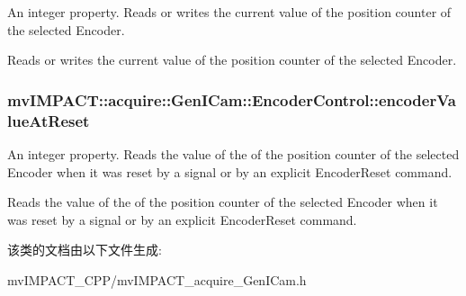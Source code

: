 An integer property. Reads or writes the current value of the position counter of the selected Encoder. 

Reads or writes the current value of the position counter of the selected Encoder. \hypertarget{classmv_i_m_p_a_c_t_1_1acquire_1_1_gen_i_cam_1_1_encoder_control_abe3354fcac087829fe183d54f9a8da19}{
\subsubsection[{encoder\+Value\+At\+Reset}]{ mv\+I\+M\+P\+A\+C\+T\+::acquire\+::\+Gen\+I\+Cam\+::\+Encoder\+Control\+::encoder\+Value\+At\+Reset}}\label{classmv_i_m_p_a_c_t_1_1acquire_1_1_gen_i_cam_1_1_encoder_control_abe3354fcac087829fe183d54f9a8da19}


An integer property. Reads the value of the of the position counter of the selected Encoder when it was reset by a signal or by an explicit Encoder\+Reset command. 

Reads the value of the of the position counter of the selected Encoder when it was reset by a signal or by an explicit Encoder\+Reset command. 

该类的文档由以下文件生成\+:\begin{DoxyCompactItemize}
\item 
mv\+I\+M\+P\+A\+C\+T\+\_\+\+C\+P\+P/mv\+I\+M\+P\+A\+C\+T\+\_\+acquire\+\_\+\+Gen\+I\+Cam.\+h\end{DoxyCompactItemize}
